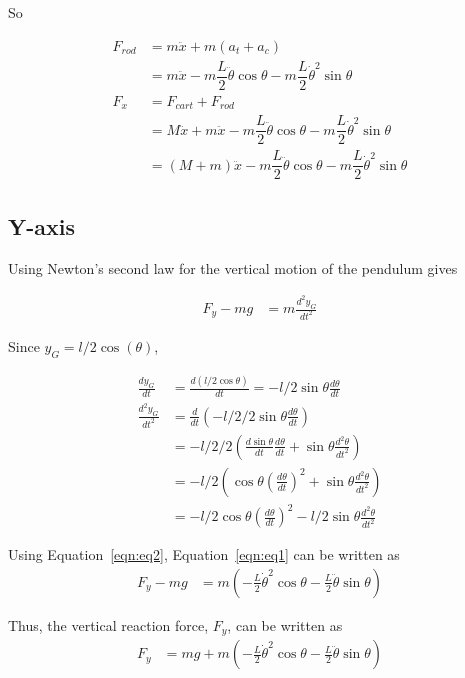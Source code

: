 \documentclass{notes}
\begin{document}
So 

\begin{align*}
  F_{rod} & = m \ddot{x} + m (a_{t} + a_{c}) \\
         & = m \ddot{x} -m\dfrac{L}{2} \ddot{\theta} \cos \theta 
                        -m\dfrac{L}{2} \dot{\theta}^2 \sin \theta \\
  F_x & = F_{cart} + F_{rod} \\
      & = M\ddot{x} + m \ddot{x} - m\dfrac{L}{2} \ddot{\theta} \cos \theta 
                    - m \dfrac{L}{2} \dot{\theta}^2 \sin \theta \\
      & = (M + m) \ddot{x} - m\dfrac{L}{2} \ddot{\theta} \cos \theta 
                    - m \dfrac{L}{2} \dot{\theta}^2 \sin \theta
\end{align*}
\FloatBarrier


\subsection{Y-axis}
Using Newton's second law for the vertical motion of the pendulum gives

\begin{align}
  F_y - mg & = m\frac{d^2y_G}{dt^2}\label{eqn:eq1}
 \end{align}
 
 Since $ y_G = l/2\cos(\theta)$,

 \begin{align}
   \frac{dy_G}{dt} & = \frac{d(l/2\cos\theta)}{dt} = -l/2\sin\theta\frac{d\theta}{dt} \nonumber\\
   \frac{d^2y_G}{dt^2} & = \frac{d}{dt}\left(-l/2/2 \sin\theta \frac{d\theta}{dt}\right) \nonumber\\
   & = -l/2/2\left(\frac{d\sin\theta}{dt}\frac{d\theta}{dt} + \sin\theta\frac{d^2\theta}{dt^2}\right) \nonumber\\
   & = -l/2\left( \cos\theta \left(\frac{d\theta}{dt}\right)^2 + \sin\theta\frac{d^2\theta}{dt^2}   \right) \nonumber\\
   & = -l/2\cos\theta\left(\frac{d\theta}{dt}\right)^2-l/2\sin\theta\frac{d^2\theta}{dt^2}\label{eqn:eq2}
 \end{align}
 
 Using Equation~\ref{eqn:eq2}, Equation~\ref{eqn:eq1} can be written as 
 \begin{align*}
   F_y - mg & = m(-\frac{L}{2}\dot{\theta}^2\cos\theta - \frac{L}{2}\ddot{\theta}\sin\theta )
 \end{align*}
 
 Thus, the vertical reaction force, $F_y$, can be written as
 \begin{align*}
   F_y & = mg + m\left(-\frac{L}{2}\dot{\theta}^2\cos\theta - \frac{L}{2}\ddot{\theta}\sin\theta\right)
 \end{align*}
 
\end{document}
